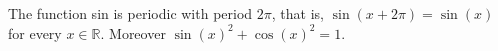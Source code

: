 The function sin is periodic with period $2\pi$, that is, $\sin(x + 2\pi) = \sin(x)$ for every $x \in \mathbb{R}$.
Moreover $\sin(x)^{2} + \cos(x)^{2} = 1$.
